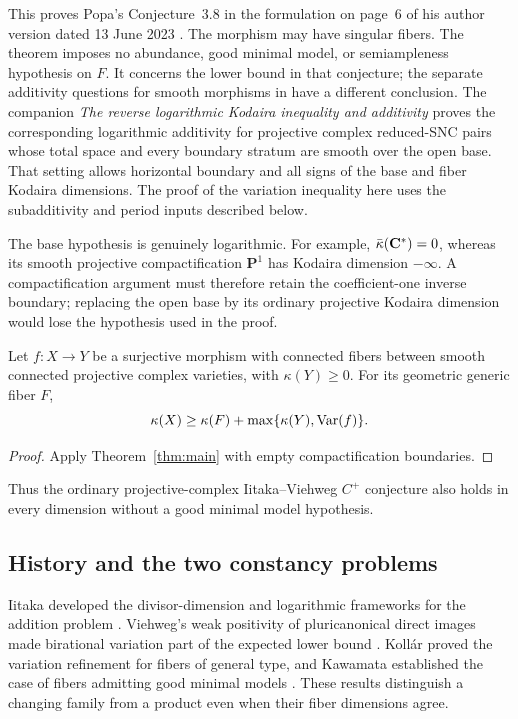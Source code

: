 This proves Popa's Conjecture~3.8 in the formulation on page~6 of
his author version dated 13 June 2023 \cite{PopaConjectures}.
The morphism may have singular fibers. The theorem imposes no abundance,
good minimal model, or semiampleness hypothesis on $F$. It concerns the
lower bound in that conjecture; the separate additivity questions for
smooth morphisms in \cite[Conjectures~3.1 and~3.9]{PopaConjectures}
have a different conclusion.
The companion \emph{The reverse logarithmic Kodaira inequality and
additivity} \cite{AdditivityCompanion} proves the corresponding
logarithmic additivity for projective complex reduced-SNC pairs whose total space
and every boundary stratum are smooth over the open base. That
setting allows horizontal boundary and all signs of the base and
fiber Kodaira dimensions. The proof of the variation inequality
here uses the subadditivity and period inputs described below.

The base hypothesis is genuinely logarithmic. For example,
$\bar\kappa(\mathbf C^*)=0$, whereas its smooth projective compactification
$\mathbf P^1$ has Kodaira dimension $-\infty$. A compactification
argument must therefore retain the coefficient-one inverse boundary;
replacing the open base by its ordinary projective Kodaira dimension
would lose the hypothesis used in the proof.

\begin{corollary}
\label{thm:projective-variation}
Let $f:X\to Y$ be a surjective morphism with connected fibers between
smooth connected projective complex varieties, with $\kappa(Y)\geq0$.
For its geometric generic fiber $F$,
\[
 \kappa(X)\geq\kappa(F)+\max\{\kappa(Y),\operatorname{Var}(f)\}.
\]
\end{corollary}

\begin{proof}
Apply Theorem~\ref{thm:main} with empty compactification boundaries.
\end{proof}

Thus the ordinary projective-complex Iitaka--Viehweg $C^+$ conjecture
also holds in every dimension without a good minimal model hypothesis.

\subsection{History and the two constancy problems}

Iitaka developed the divisor-dimension and logarithmic frameworks
for the addition problem \cite{IitakaOriginal,IitakaLog}.
Viehweg's weak positivity of pluricanonical direct images made
birational variation part of the expected lower bound
\cite{ViehwegAdditivity,Viehweg83b}. Koll\'ar proved the variation
refinement for fibers of general type, and Kawamata established the
case of fibers admitting good minimal models
\cite{Kollar87,KawamataKodaira}. These results distinguish a changing
family from a product even when their fiber dimensions agree.

